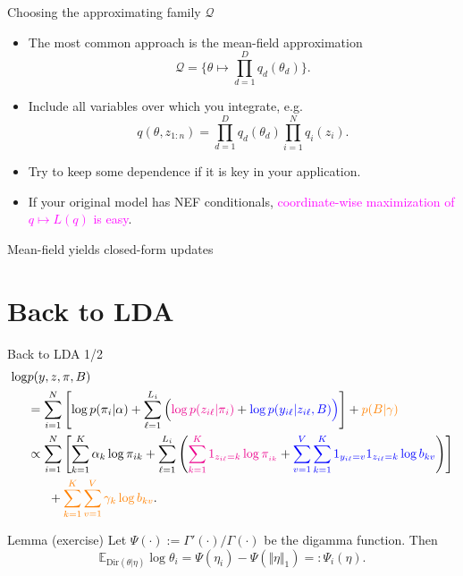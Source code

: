 \documentclass[10pt]{beamer}
\newcommand\un[1]{\textcolor{magenta}{#1}}
\newcommand\unn[1]{\textcolor{blue}{#1}}
\newcommand\unnnn[1]{\textcolor{orange}{#1}}
\begin{document}
\begin{frame}{Choosing the approximating family $\mathcal Q$}
\begin{itemize}
  \item The most common approach is the mean-field approximation
  $$ \mathcal Q = \{\theta\mapsto \prod_{d=1}^D q_d(\theta_d)\}.$$
  \item Include all variables over which you integrate, e.g.
  \vfill
  \vfill
  $$
  q(\theta, z_{1:n}) = \prod_{d=1}^D q_d(\theta_d) \prod_{i=1}^N q_i(z_i).
  $$
\end{itemize}
\begin{itemize}
  \item Try to keep some dependence if it is key in your application.
  \item If your original model has NEF conditionals, \un{coordinate-wise maximization of $q\mapsto L(q)$ is easy}.
\end{itemize}
\end{frame}

\begin{frame}{Mean-field yields closed-form updates}
\end{frame}
\section{Back to LDA}
\begin{frame}{Back to LDA 1/2}
  \footnotesize
\begin{align*}
  \log &p(y, z, \pi, B)\\
  &=\sum_{i=1}^N \left[\log p(\pi_i\vert \alpha) + \sum_{\ell=1}^{L_i} \Big(\un{\log p(z_{i\ell}\vert\pi_i)} + \unn{\log p(y_{i\ell}\vert z_{i\ell}, B)\Big)}\right] + \unnnn{p(B\vert \gamma)}\\
  &\propto \sum_{i=1}^N \left[\sum_{k=1}^K \alpha_k \log \pi_{ik} + \sum_{\ell=1}^{L_i} \left(\un{\sum_{k=1}^K 1_{z_{i\ell}=k}\log\pi_{_{ik}}} + \unn{\sum_{v=1}^V \sum_{k=1}^K 1_{y_{i\ell}=v}1_{z_{i\ell}=k} \log b_{kv}}\right)\right] \\
  &~~~~~+ \unnnn{\sum_{k=1}^K \sum_{v=1}^V \gamma_k\log b_{kv}}.
\end{align*}
\vfill
\vspace{1cm}
\begin{block}{Lemma (exercise)}
Let $\Psi(\cdot) := \Gamma'(\cdot)/\Gamma(\cdot)$ be the digamma function. Then
$$
\mathbb{E}_{\text{Dir}(\theta\vert\eta)} \log \theta_i = \Psi(\eta_i) - \Psi(\Vert \eta\Vert_1) =: \Psi_i(\eta).
$$
\end{block}
\vfill
\end{frame}
\end{document}
